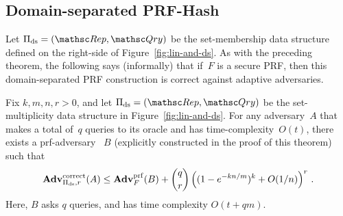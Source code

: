 


\subsection{Domain-separated PRF-Hash}
Let $\setprim_{\mathrm{ds}}= (\Rep, \Qry)$ be the set-membership data
structure defined on the right-side of Figure~\ref{fig:lin-and-ds}.
As with the preceding theorem, the following says (informally) that
if~$F$ is a secure PRF, then this domain-separated PRF construction is
correct against adaptive adversaries.  

\begin{theorem}\label{thm2}\label{thm:ds-correctness}
Fix $k,m,n,r>0$, and let $\setprim_{\mathrm{ds}}= (\Rep, \Qry)$ be the set-multiplicity data structure in Figure~\ref{fig:lin-and-ds}.  For any adversary~$A$ that makes a total of~$q$ queries to its oracle and has time-complexity~$O(t)$, there exists a prf-adversary ~$B$ (explicitly constructed in the proof of this theorem) such that
\[
\mathrm{\mathbf{Adv}}^{\mathrm{correct}}_{\Pi_{\mathrm{ds}},r}(A) \leq  \mathbf{Adv}^{\mathrm{prf}}_{F}(B)  + {\dbinom{q}{r}} \left( (1-e^{-kn/m})^k + O(1/n) \right)^r\,.
\]
Here, $B$ asks $q$ queries, and has time complexity $O(t+qm)$.
\end{theorem}


